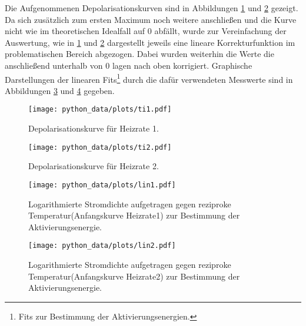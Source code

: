 Die Aufgenommenen Depolarisationskurven sind in Abbildungen \ref{fig:TI1} und \ref{fig:TI2} gezeigt. Da sich zusätzlich zum ersten Maximum noch weitere anschließen und die
Kurve nicht wie im theoretischen Idealfall auf $0$ abfällt, wurde zur Vereinfachung der Auswertung, wie in \ref{fig:TI1} und \ref{fig:TI2} dargestellt jeweils eine lineare Korrekturfunktion
im problematischen Bereich abgezogen. Dabei wurden weiterhin die Werte die anschließend unterhalb von $0$ lagen nach oben korrigiert.
Graphische Darstellungen der linearen Fits\footnote{Fits zur Bestimmung der Aktivierungsenergien.} durch die dafür verwendeten Messwerte
sind in Abbildungen \ref{fig:lin1} und \ref{fig:lin2} gegeben.

\begin{figure}
  \centering
  \texttt{[image: python\_data/plots/ti1.pdf]}
  \caption{Depolarisationskurve für Heizrate 1.}
  \label{fig:TI1}
\end{figure}

\begin{figure}
  \centering
  \texttt{[image: python\_data/plots/ti2.pdf]}
  \caption{Depolarisationskurve für Heizrate 2.}
  \label{fig:TI2}
\end{figure}

\begin{figure}
  \centering
  \texttt{[image: python\_data/plots/lin1.pdf]}
  \caption{Logarithmierte Stromdichte aufgetragen gegen reziproke Temperatur(Anfangskurve Heizrate1) zur Bestimmung der Aktivierungsenergie.}
  \label{fig:lin1}
\end{figure}

\begin{figure}
  \centering
  \texttt{[image: python\_data/plots/lin2.pdf]}
  \caption{Logarithmierte Stromdichte aufgetragen gegen reziproke Temperatur(Anfangskurve Heizrate2) zur Bestimmung der Aktivierungsenergie.}
  \label{fig:lin2}
\end{figure}

